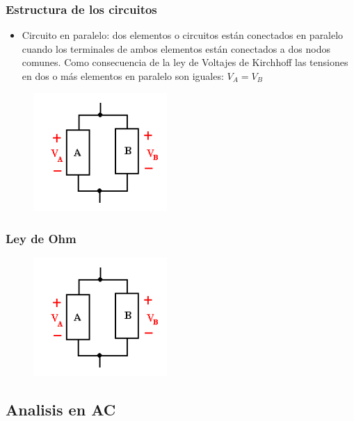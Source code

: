 \documentclass{beamer}
\begin{document}
\begin{frame}
\frametitle{Estructura de los circuitos}

\begin{itemize}
\item Circuito en paralelo: dos elementos o circuitos están conectados en paralelo cuando los terminales de ambos elementos están conectados a dos nodos comunes. Como consecuencia de la ley de Voltajes de Kirchhoff las tensiones en dos o más elementos en paralelo son iguales: $V_{A} = V_{B}$
\end{itemize}

\begin{figure}[!h]
\centering
\includegraphics[width=2in]{paralelo}
\end{figure}

\end{frame}

\begin{frame}
\frametitle{Ley de Ohm}

\begin{figure}[!h]
\centering
\includegraphics[width=2in]{paralelo}
\end{figure}
\end{frame}


\begin{frame}
\frametitle{}

\end{frame}

\subsection{Analisis en AC}
\end{document}
